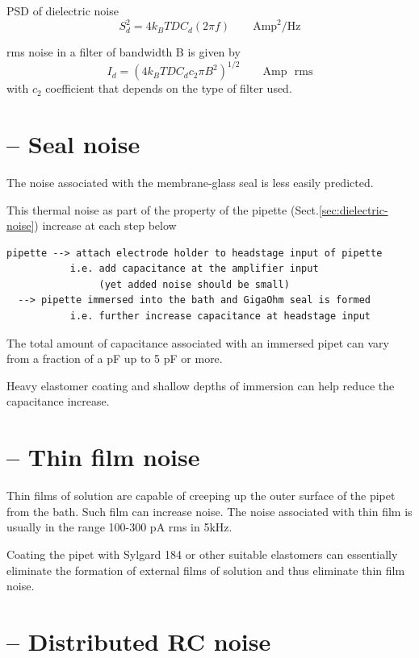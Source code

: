 PSD of dielectric noise
\begin{equation}
S_d^2 = 4k_B T D C_d (2\pi f)  \qquad \text{Amp}^2/\text{Hz}
\end{equation}

rms noise in a filter of bandwidth B is given by
\begin{equation}
I_d = (4k_B T D C_d c_2 \pi B^2)^{1/2} \qquad \text{Amp } \text{ rms}
\end{equation}
with $c_2$ coefficient that depends on the type of filter used.


\section{-- Seal noise}

The noise associated with the membrane-glass seal is less easily
predicted.

This thermal noise as part of the property of the pipette
(Sect.\ref{sec:dielectric-noise}) increase at each step below
\begin{verbatim}
pipette --> attach electrode holder to headstage input of pipette
           i.e. add capacitance at the amplifier input
                (yet added noise should be small)
  --> pipette immersed into the bath and GigaOhm seal is formed
           i.e. further increase capacitance at headstage input
\end{verbatim}

The total amount of capacitance associated with an immersed pipet can vary from
a fraction of a pF up to 5 pF or more.

Heavy elastomer coating and shallow depths of immersion can help reduce the
capacitance increase.

\section{-- Thin film noise}

Thin films of solution are capable of creeping up the outer surface
of the pipet from the bath.
Such film can increase noise. The noise associated with thin film
is usually in the range 100-300 pA rms in 5kHz.

Coating the pipet with Sylgard 184 or other suitable elastomers can essentially
eliminate the formation of external films of solution and thus eliminate thin
film noise.

\section{-- Distributed RC noise}

